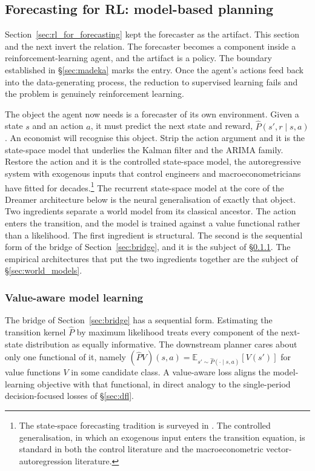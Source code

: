 \subsection{Forecasting for RL: model-based planning}
\label{sec:model_based_planning}

Section~\ref{sec:rl_for_forecasting} kept the forecaster as the artifact.
This section and the next invert the relation. The forecaster becomes a
component inside a reinforcement-learning agent, and the artifact is a
policy. The boundary established in \S\ref{sec:madeka} marks the entry.
Once the agent's actions feed back into the data-generating process, the
reduction to supervised learning fails and the problem is genuinely
reinforcement learning.

The object the agent now needs is a forecaster of its own environment.
Given a state $s$ and an action $a$, it must predict the next state and
reward, $\widehat P(s', r \mid s, a)$. An economist will recognise this
object. Strip the action argument and it is the state-space model that
underlies the Kalman filter and the ARIMA family. Restore the action and
it is the controlled state-space model, the autoregressive system with
exogenous inputs that control engineers and macroeconometricians have
fitted for decades.\footnote{The state-space forecasting tradition is
surveyed in \citet{DurbinKoopman2012}. The controlled generalisation, in
which an exogenous input enters the transition equation, is standard in
both the control literature and the macroeconometric vector-autoregression
literature.} The recurrent state-space model at the core of the Dreamer
architecture below is the neural generalisation of exactly that object.
Two ingredients separate a world model from its classical ancestor. The
action enters the transition, and the model is trained against a value
functional rather than a likelihood. The first ingredient is structural.
The second is the sequential form of the bridge of
Section~\ref{sec:bridge}, and it is the subject of \S\ref{sec:vaml_ve}.
The empirical architectures that put the two ingredients together are the
subject of \S\ref{sec:world_models}.

\subsubsection{Value-aware model learning}
\label{sec:vaml_ve}

The bridge of Section~\ref{sec:bridge} has a sequential form. Estimating
the transition kernel $\widehat P$ by maximum likelihood treats every
component of the next-state distribution as equally informative. The
downstream planner cares about only one functional of it, namely
$(\widehat P V)(s, a) = \mathbb E_{s' \sim \widehat P(\cdot \mid s, a)}
[V(s')]$ for value functions $V$ in some candidate class. A value-aware
loss aligns the model-learning objective with that functional, in direct
analogy to the single-period decision-focused losses of \S\ref{sec:dfl}.

